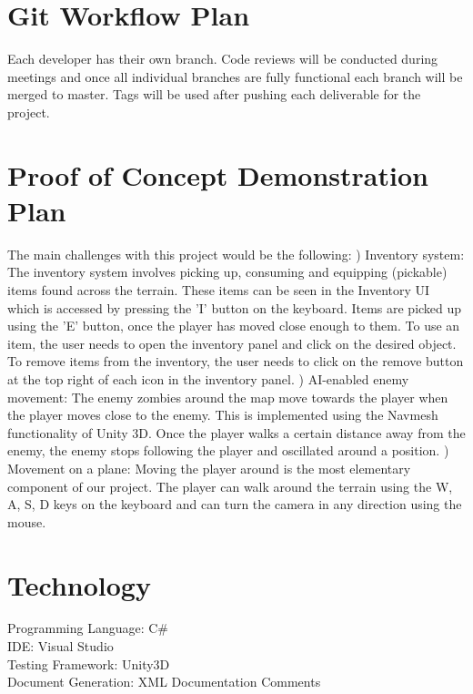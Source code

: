 \documentclass{article}
\begin{document}
\section{Git Workflow Plan}
Each developer has their own branch. Code reviews will be conducted during meetings and once all individual branches are fully functional each branch will be merged to master. Tags will be used after pushing each deliverable for the project.

\section{Proof of Concept Demonstration Plan}
The main challenges with this project would be the following: \newline
{}) Inventory system: The inventory system involves picking up, consuming and equipping (pickable) items found across the terrain. These items can be seen in the Inventory UI which is accessed by pressing the 'I' button on the keyboard. Items are picked up using the 'E' button, once the player has moved close enough to them. To use an item, the user needs to open the inventory panel and click on the desired object. To remove items from the inventory, the user needs to click on the remove button at the top right of each icon in the inventory panel.
\newline
{}) AI-enabled enemy movement: The enemy zombies around the map move towards the player when the player moves close to the enemy. This is implemented using the Navmesh functionality of Unity 3D. Once the player walks a certain distance away from the enemy, the enemy stops following the player and oscillated around a position.
\newline
{}) Movement on a plane: Moving the player around is the most elementary component of our project. The player can walk around the terrain using the W, A, S, D keys on the keyboard and can turn the camera in any direction using the mouse.

\section{Technology}
Programming Language: C\# \\
IDE: Visual Studio\\
Testing Framework: Unity3D\\
Document Generation: XML Documentation Comments
\end{document}
